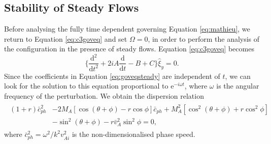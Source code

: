 \subsection{Stability of Steady Flows}
\label{subsec:steady}

Before analysing the fully time dependent governing Equation \eqref{eq:mathieu}, we return to Equation \eqref{eq:c3goveq} and set $\Omega = 0$, in order to perform the analysis of the configuration in the presence of steady flows.
Equation \eqref{eq:c3goveq} becomes
%
\begin{equation}
\label{eq:goveqsteady}
\bigg\{ \frac{\mathrm{d}^2}{\mathrm{d} t^2}
+ 2 i A \frac{\mathrm{d}}{\mathrm{d} t}
- B + C \bigg\} \hat \xi_y
= 0.
\end{equation}
%
Since the coefficients in Equation \eqref{eq:goveqsteady} are independent of $t$, we can look for the solution to this equation proportional to $\mathrm{e}^{-i \omega t}$, where $\omega$ is the angular frequency of the perturbation.
We obtain the dispersion relation 
%
\begin{align}
\begin{split}
\label{eq:c3disprel}
(1 + r) \bar c_{ph}^2
& - 2 M_A [ \cos(\theta + \phi) - r \cos\phi ] \bar c_{ph}
+ M_A^2 [ \cos^2(\theta + \phi) + r \cos^2\phi ]
\\[0.1cm]
& - \sin^2(\theta + \phi)
- r \bar v_{A}^2 \sin^2\phi
= 0,
\end{split}
\end{align}
%
where $\bar c_{ph}^2 = \omega^2 / k^2 v_{A i}^2$ is the non-dimensionalised phase speed.

